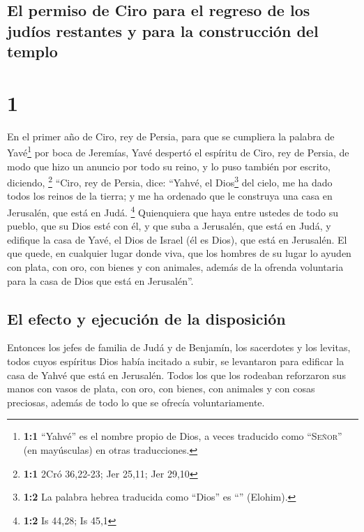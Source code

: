 \hypertarget{el-permiso-de-ciro-para-el-regreso-de-los-juduxedos-restantes-y-para-la-construcciuxf3n-del-templo}{%
\subsection{El permiso de Ciro para el regreso de los judíos restantes y
para la construcción del
templo}\label{el-permiso-de-ciro-para-el-regreso-de-los-juduxedos-restantes-y-para-la-construcciuxf3n-del-templo}}

\hypertarget{section}{%
\section{1}\label{section}}

 En el primer año de Ciro, rey de Persia, para que se
cumpliera la palabra de Yavé\footnote{\textbf{1:1} ``Yahvé'' es el
  nombre propio de Dios, a veces traducido como ``\textsc{Señor}'' (en
  mayúsculas) en otras traducciones.} por boca de Jeremías, Yavé
despertó el espíritu de Ciro, rey de Persia, de modo que hizo un anuncio
por todo su reino, y lo puso también por escrito, diciendo, \footnote{\textbf{1:1}
  2Cró 36,22-23; Jer 25,11; Jer 29,10}  ``Ciro, rey de
Persia, dice: ``Yahvé, el Dios\footnote{\textbf{1:2} La palabra hebrea
  traducida como ``Dios'' es ``'' (Elohim).} del cielo, me
ha dado todos los reinos de la tierra; y me ha ordenado que le construya
una casa en Jerusalén, que está en Judá. \footnote{\textbf{1:2} Is
  44,28; Is 45,1}  Quienquiera que haya entre ustedes de
todo su pueblo, que su Dios esté con él, y que suba a Jerusalén, que
está en Judá, y edifique la casa de Yavé, el Dios de Israel (él es
Dios), que está en Jerusalén.  El que quede, en cualquier
lugar donde viva, que los hombres de su lugar lo ayuden con plata, con
oro, con bienes y con animales, además de la ofrenda voluntaria para la
casa de Dios que está en Jerusalén''.

\hypertarget{el-efecto-y-ejecuciuxf3n-de-la-disposiciuxf3n}{%
\subsection{El efecto y ejecución de la
disposición}\label{el-efecto-y-ejecuciuxf3n-de-la-disposiciuxf3n}}

 Entonces los jefes de familia de Judá y de Benjamín, los
sacerdotes y los levitas, todos cuyos espíritus Dios había incitado a
subir, se levantaron para edificar la casa de Yahvé que está en
Jerusalén.  Todos los que los rodeaban reforzaron sus
manos con vasos de plata, con oro, con bienes, con animales y con cosas
preciosas, además de todo lo que se ofrecía voluntariamente.

